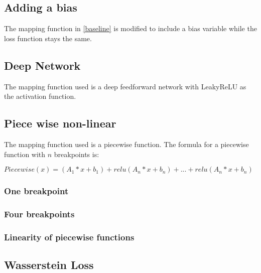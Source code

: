 \documentclass[11pt]{article}
\begin{document}
\subsection{Adding a bias}
The mapping function in \ref{baseline} is modified to include a bias variable while the loss function stays the same.

\subsection{Deep Network}
The mapping function used is a deep feedforward network with LeakyReLU as the activation function.

\subsection{Piece wise non-linear}
The mapping function used is a piecewise function. The formula for a piecewise function with $n$ breakpoints is:

$Piecewise(x) = (A_1*x + b_1) + relu(A_n*x + b_n) + ... + relu(A_n*x + b_n)$

\subsubsection{One breakpoint}

\subsubsection{Four breakpoints}

\subsubsection{Linearity of piecewise functions}

\subsection{Wasserstein Loss}
\end{document}
